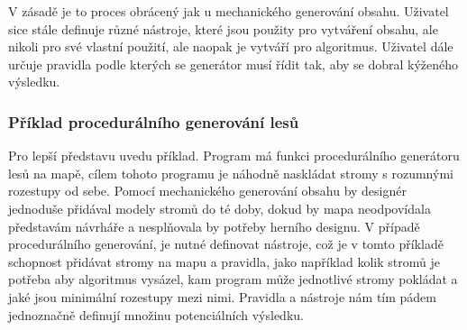 V zásadě je to proces obrácený jak u mechanického generování obsahu. Uživatel sice stále definuje různé nástroje, které jsou použity pro vytváření obsahu, ale nikoli pro své vlastní použití, ale naopak je vytváří pro algoritmus. Uživatel dále určuje pravidla podle kterých se generátor musí řídit tak, aby se dobral kýženého výsledku.

\subsubsection{Příklad procedurálního generování lesů}
\label{proceduralExample}
Pro lepší představu uvedu příklad. Program má funkci procedurálního generátoru lesů na mapě, cílem tohoto programu je náhodně naskládat stromy s rozumnými rozestupy od sebe. Pomocí mechanického generování obsahu by designér jednoduše přidával modely stromů do té doby, dokud by mapa neodpovídala představám návrháře a nesplňovala by potřeby herního designu. V případě procedurálního generování, je nutné definovat nástroje, což je v tomto příkladě schopnost přidávat stromy na mapu a pravidla, jako například kolik stromů je potřeba aby algoritmus vysázel, kam program může jednotlivé stromy pokládat a jaké jsou minimální rozestupy mezi nimi. Pravidla a nástroje nám tím pádem jednoznačně definují množinu potenciálních výsledku.

